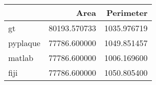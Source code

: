 \begin{tabular}{lrr}
    \toprule
     & Area & Perimeter \\
    \midrule
    gt & 80193.570733 & 1035.976719 \\
    pyplaque & 77786.600000 & 1049.851457 \\
    matlab & 77786.600000 & 1006.169600 \\
    fiji & 77786.600000 & 1050.805400 \\
    \bottomrule
    \end{tabular}